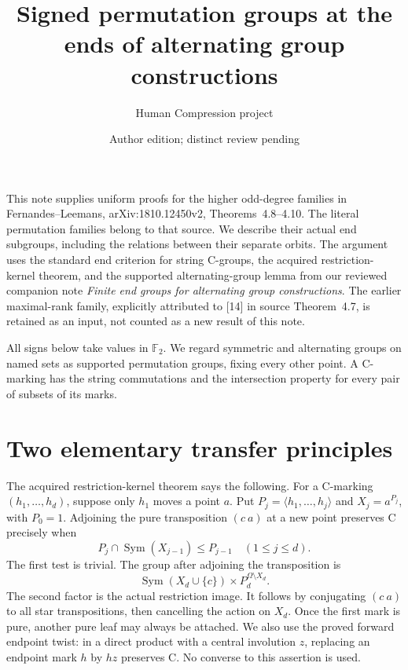 \documentclass[11pt]{article}
\title{Signed permutation groups at the ends of alternating group constructions}
\author{Human Compression project}
\date{Author edition; distinct review pending}
\newcommand{\gen}[1]{\langle#1\rangle}
\newcommand{\Sym}{\operatorname{Sym}}
\begin{document}
\maketitle

This note supplies uniform proofs for the higher odd-degree families in
Fernandes--Leemans, arXiv:1810.12450v2, Theorems~4.8--4.10. The literal
permutation families belong to that source. We describe their actual end
subgroups, including the relations between their separate orbits. The
argument uses the standard end criterion for string C-groups, the acquired
restriction-kernel theorem, and the supported alternating-group lemma from
our reviewed companion note \emph{Finite end groups for alternating group
constructions}. The earlier maximal-rank family, explicitly attributed
to [14] in source Theorem~4.7, is retained as an input, not counted as a
new result of this note.

All signs below take values in $\mathbb F_2$. We regard symmetric and
alternating groups on named sets as supported permutation groups, fixing
every other point. A C-marking has the string commutations and the
intersection property for every pair of subsets of its marks.

\section{Two elementary transfer principles}
The acquired restriction-kernel theorem says the following. For a C-marking
$(h_1,\ldots,h_d)$, suppose only $h_1$ moves a point $a$. Put
$P_j=\gen{h_1,\ldots,h_j}$ and $X_j=a^{P_j}$, with $P_0=1$.
Adjoining the pure
transposition $(c\ a)$ at a new point preserves C precisely when
\begin{equation}\label{leaf}
 P_j\cap\Sym(X_{j-1})\le P_{j-1}\quad(1\le j\le d).
\end{equation}
The first test is trivial. The group after adjoining the transposition is
\begin{equation}\label{factor}
 \Sym(X_d\cup\{c\})\times P_d^{\Omega\setminus X_d}.
\end{equation}
The second factor is the actual restriction image. It follows by
conjugating $(c\ a)$ to all star transpositions, then cancelling the
action on $X_d$. Once the first mark is pure, another pure leaf may
always be attached. We also use the proved forward endpoint twist:
in a direct product with a central involution $z$, replacing an endpoint
mark $h$ by $hz$ preserves C. No converse to this assertion is used.
\end{document}
